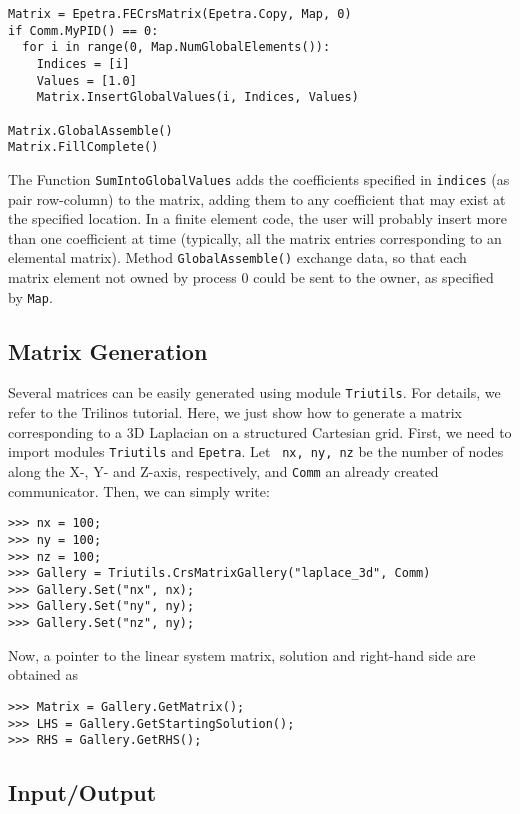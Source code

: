 \documentclass[10pt,relax]{SANDreport}
\begin{document}
\begin{verbatim}
Matrix = Epetra.FECrsMatrix(Epetra.Copy, Map, 0)
if Comm.MyPID() == 0:
  for i in range(0, Map.NumGlobalElements()):
    Indices = [i]
    Values = [1.0]
    Matrix.InsertGlobalValues(i, Indices, Values)

Matrix.GlobalAssemble() 
Matrix.FillComplete()
\end{verbatim}
The Function \verb!SumIntoGlobalValues! adds the coefficients specified
in \verb!indices! (as pair row-column) to the matrix, adding them to any
coefficient that may exist at the specified location. In a finite
element code, the user will probably insert more than one coefficient
at time (typically, all the matrix entries corresponding to an elemental
matrix). Method \verb!GlobalAssemble()! exchange data, so that 
each matrix element not owned by
process 0 could be sent to the owner, as specified by \verb!Map!. 

\subsection{Matrix Generation}
\label{sec:generation}

Several matrices can be easily generated using module {\tt Triutils}. For
details, we refer to the Trilinos tutorial. Here, we just show how to generate
a matrix corresponding to a 3D Laplacian on a structured Cartesian grid.
First, we need to import modules \verb!Triutils! and \verb!Epetra!. Let {\tt
  nx, ny, nz} be the number of nodes along the X-, Y- and Z-axis,
  respectively, and \verb!Comm! an already created communicator.
  Then, we can simply write:
\begin{verbatim}
>>> nx = 100;
>>> ny = 100;
>>> nz = 100;
>>> Gallery = Triutils.CrsMatrixGallery("laplace_3d", Comm)
>>> Gallery.Set("nx", nx);
>>> Gallery.Set("ny", ny);
>>> Gallery.Set("nz", ny);
\end{verbatim}
Now, a pointer to the linear system matrix, solution and right-hand side are
obtained as
\begin{verbatim}
>>> Matrix = Gallery.GetMatrix();
>>> LHS = Gallery.GetStartingSolution();
>>> RHS = Gallery.GetRHS();
\end{verbatim}

\subsection{Input/Output}
\label{sec:io}
\end{document}
